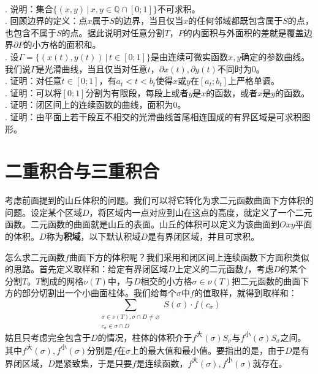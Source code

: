 \documentclass[12pt,UTF8]{ctexbook}
\begin{document}
\begin{xt}
    \mbox{} \\
    . 说明：集合$\{(x,y)\,|\,x,y\in\mathbb{Q}\cap[0;1]\}$不可求积。\\
    . 回顾边界的定义：点$x$属于$S$的边界，当且仅当$x$的任何邻域都既包含属于$S$的点，也包含不属于$S$的点。据此说明对任意分割$T$，$P$的内面积与外面积的差就是覆盖边界$\partial P$的小方格的面积和。\\
    . 设$\Gamma = \{(x(t),y(t))\,|\,t\in[0;1]\}$是由连续可微实函数$x,y$确定的参数曲线。我们说$\Gamma$是光滑曲线，当且仅当对任意$t$，$\partial x(t), \partial y(t)$不同时为$0$。\\
    . 证明：对任意$t\in[0;1]$，有$a_t<t<b_t$使得$x$或$y$在$[a_t;b_t]$上严格单调。\\
    . 证明：可以将$[0;1]$分割为有限段，每段上或者$y$是$x$的函数，或者$x$是$y$的函数。\\
    . 证明：闭区间上的连续函数的曲线，面积为$0$。\\
    . 证明：由平面上若干段互不相交的光滑曲线首尾相连围成的有界区域是可求积图形。
\end{xt}

\section{二重积合与三重积合}
考虑前面提到的山丘体积的问题。我们可以将它转化为求二元函数曲面下方体积的问题。设定某个区域$D$，将区域内一点对应到山在这点的高度，就定义了一个二元函数。二元函数的曲面就是山丘的表面。山丘的体积可以定义为该曲面到$Oxy$平面的体积。$D$称为\textbf{积域}，以下默认积域$D$是有界闭区域，并且可求积。

怎么求二元函数$f$曲面下方的体积呢？我们采用和闭区间上连续函数下方面积类似的思路。首先定义取样和：给定有界闭区域$D$上定义的二元函数$f$，考虑$D$的某个分割$T$。$T$割成的网格$\nu(T)$中，与$D$相交的小方格$\sigma\in\nu(T)$把二元函数的曲面下方的部分切割出一个小曲面柱体。我们给每个$\sigma$中$f$的值取样，就得到取样和：
$$ \sum_{\substack{\sigma\in \nu(T),\sigma\cap D\neq\varnothing\\c_{\sigma}\in\sigma\cap D}} S(\sigma)\cdot f(c_{\sigma}) $$
姑且只考虑完全包含于$D$的情况，柱体的体积介于$f^{\text{大}}(\sigma)S_{\sigma}$与$f^{\text{小}}(\sigma)S_{\sigma}$之间。其中$f^{\text{大}}(\sigma),f^{\text{小}}(\sigma)$分别是$f$在$\sigma$上的最大值和最小值。要指出的是，由于$D$是有界闭区域，$D$是紧致集，于是只要$f$是连续函数，$f^{\text{大}}(\sigma),f^{\text{小}}(\sigma)$就存在。
\end{document}
